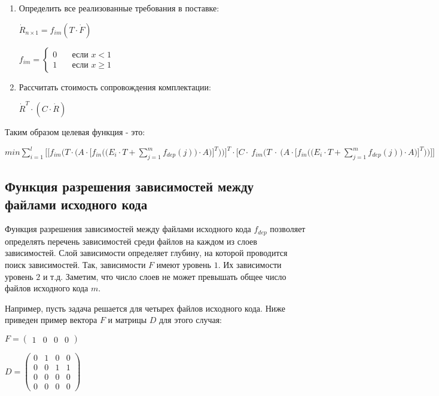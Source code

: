 \begin{enumerate}
  \item Определить все реализованные требования в поставке:
  \begin{center}
    $\dot{R}_{n \times 1} = f_{im}(T \cdot \dot{F})$
  \end{center}
  \begin{center}
    $
    f_{im} =
    \begin{cases}
      0 & \quad \text{если } x < 1 \\
      1 & \quad \text{если } x \geq 1
    \end{cases}
    $
  \end{center}

  \item Рассчитать стоимость сопровождения комплектации:
  \begin{center}
    $\dot{R}^{T} \cdot (C \cdot \dot{R})$
  \end{center}
\end{enumerate}

Таким образом целевая функция - это:
  \begin{center}
    $\displaystyle min \sum^{l}_{i = 1} \Bigg[\Bigg[f_{im}\Bigg(T \cdot \bigg(A \cdot \bigg[f_{in}\Big(\big(E_{i} \cdot T + \sum^{m}_{j = 1}f_{dep}(j)\big) \cdot A\Big)\bigg]^{T}\bigg)\Bigg)\Bigg]^{T} \cdot \Bigg[C \cdot~f_{im}\Bigg(T~\cdot~\bigg(A \cdot \bigg[f_{in}\Big(\big(E_{i} \cdot T + \sum^{m}_{j = 1}f_{dep}(j)\big) \cdot A\Big)\bigg]^{T}\bigg)\Bigg)\Bigg]\Bigg]$
  \end{center}

\subsection*{Функция разрешения зависимостей между файлами исходного кода}
Функция разрешения зависимостей между файлами исходного кода $f_{dep}$ позволяет определять перечень зависимостей среди файлов на каждом из слоев зависимостей. Слой зависимости определяет глубину, на которой проводится поиск зависимостей. Так, зависимости $F$ имеют уровень $1$. Их зависимости уровень $2$ и т.д. Заметим, что число слоев не может превышать общее число файлов исходного кода $m$.

Например, пусть задача решается для четырех файлов исходного кода. Ниже приведен пример вектора $F$ и матрицы $D$ для этого случая:
\begin{center}
  $
    F = \begin{pmatrix}
      1 & 0 & 0 & 0 
    \end{pmatrix}
  $
\end{center}
\begin{center}
  $
    D = \begin{pmatrix}
    0 & 1 & 0 & 0 \\
    0 & 0 & 1 & 1 \\
    0 & 0 & 0 & 0 \\
    0 & 0 & 0 & 0 
    \end{pmatrix}
  $
\end{center}

